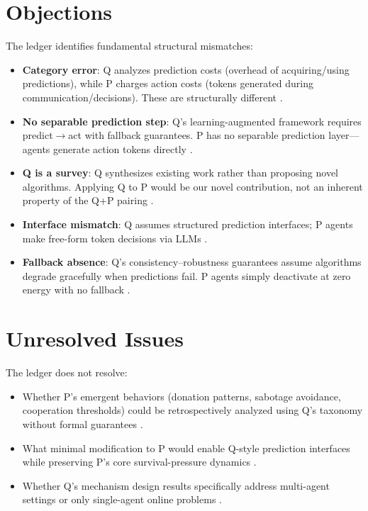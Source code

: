 \documentclass{article}
\begin{document}
\section*{Objections}

The ledger identifies fundamental structural mismatches:
\begin{itemize}
    \item \textbf{Category error}: Q analyzes prediction costs (overhead of acquiring/using predictions), while P charges action costs (tokens generated during communication/decisions). These are structurally different .
    \item \textbf{No separable prediction step}: Q's learning-augmented framework requires predict\(\to\)act with fallback guarantees. P has no separable prediction layer---agents generate action tokens directly .
    \item \textbf{Q is a survey}: Q synthesizes existing work rather than proposing novel algorithms. Applying Q to P would be our novel contribution, not an inherent property of the Q+P pairing .
    \item \textbf{Interface mismatch}: Q assumes structured prediction interfaces; P agents make free-form token decisions via LLMs .
    \item \textbf{Fallback absence}: Q's consistency--robustness guarantees assume algorithms degrade gracefully when predictions fail. P agents simply deactivate at zero energy with no fallback .
\end{itemize}

\section*{Unresolved Issues}

The ledger does not resolve:
\begin{itemize}
    \item Whether P's emergent behaviors (donation patterns, sabotage avoidance, cooperation thresholds) could be retrospectively analyzed using Q's taxonomy without formal guarantees .
    \item What minimal modification to P would enable Q-style prediction interfaces while preserving P's core survival-pressure dynamics .
    \item Whether Q's mechanism design results specifically address multi-agent settings or only single-agent online problems .
\end{itemize}
\end{document}
